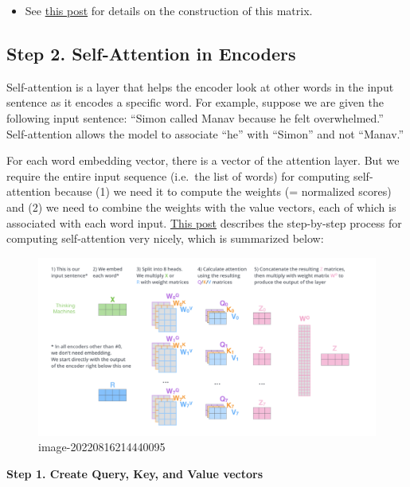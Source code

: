 \documentclass[
]{book}
\providecommand{\tightlist}{%
  \setlength{\itemsep}{0pt}\setlength{\parskip}{0pt}}
\begin{document}
\begin{itemize}
\tightlist
\item
  See \href{https://jalammar.github.io/illustrated-transformer/}{this post} for details on the construction of this matrix.
\end{itemize}

\hypertarget{step-2.-self-attention-in-encoders}{%
\subsection{Step 2. Self-Attention in Encoders}\label{step-2.-self-attention-in-encoders}}

Self-attention is a layer that helps the encoder look at other words in the input sentence as it encodes a specific word. For example, suppose we are given the following input sentence: ``Simon called Manav because he felt overwhelmed.'' Self-attention allows the model to associate ``he'' with ``Simon'' and not ``Manav.''

For each word embedding vector, there is a vector of the attention layer. But we require the entire input sequence (i.e.~the list of words) for computing self-attention because (1) we need it to compute the weights (= normalized scores) and (2) we need to combine the weights with the value vectors, each of which is associated with each word input. \href{https://jalammar.github.io/illustrated-transformer/}{This post} describes the step-by-step process for computing self-attention very nicely, which is summarized below:

\begin{figure}
\centering
\includegraphics{Figures/transformers_04.png}
\caption{image-20220816214440095}
\end{figure}

\textbf{Step 1. Create Query, Key, and Value vectors}
\end{document}
